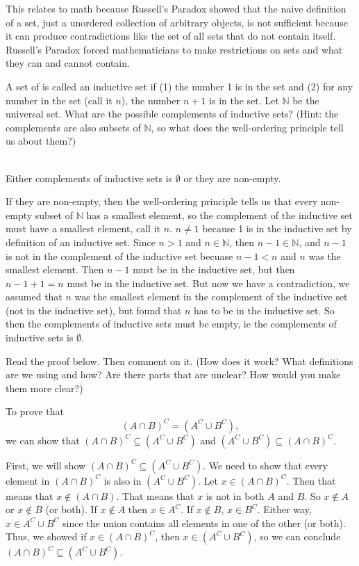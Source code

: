 \documentclass[12 pt]{exam}
\begin{document}
\begin{questions}
\begin{solution}
This relates to math because Russell's Paradox showed that the naive definition of a set, just a unordered collection of arbitrary objects, is not sufficient because it can produce contradictions like the set of all sets that do not contain itself. Russell's Paradox forced mathematicians to make restrictions on sets and what they can and cannot contain.
\end{solution}


\question  A set of  is called an inductive set if (1) the number 1 is in the set and (2) for any number in the set (call it $n$), the number $n+1$ is in the set. Let $\mathbb{N}$ be the universal set. What are the possible complements of inductive sets?  (Hint: the complements are also subsets of $\mathbb{N}$, so what does the well-ordering principle tell us about them?)
\begin{solution} \\
Either complements of inductive sets is $\emptyset$ or they are non-empty.

If they are non-empty, then the well-ordering principle tells us that every non-empty subset of $\mathbb{N}$ has a smallest element, so the complement of the inductive set must have a smallest element, call it $n$. $n \neq 1$ because 1 is in the inductive set by definition of an inductive set. Since $n > 1$ and $n \in \mathbb{N}$, then $n-1 \in \mathbb{N}$, and $n-1$ is not in the complement of the inductive set becuase $n-1 < n$ and $n$ was the smallest element. Then $n-1$ must be in the inductive set, but then $n-1 + 1 = n$ must be in the inductive set. But now we have a contradiction, we assumed that $n$ was the smallest element in the complement of the inductive set (not in the inductive set), but found that $n$ has to be in the inductive set. So then the complements of inductive sets must be empty, ie the complements of inductive sets is $\emptyset$.
\end{solution}

\question Read the proof below.  Then comment on it. (How does it work? What definitions are we using and how? Are there parts that are unclear? How would you make them more clear?)

To prove that $$(A \cap B)^C = (A^C \cup B^C),$$ we can show that $(A \cap B)^C \subseteq (A^C \cup B^C)$ and $(A^C \cup B^C) \subseteq (A \cap B)^C$. 

First, we will show $(A \cap B)^C \subseteq (A^C \cup B^C).$ We need to show that every element in $(A \cap B)^C$ is also in $(A^C \cup B^C)$. Let $x \in (A \cap B)^C$. Then that means that $x  \notin (A \cap B)$.  That means that $x$ is not in both $A$ and $B$.  So $x  \notin A$ or $x \notin B$ (or both). If $x  \notin A$ then $x \in A^C$. If $x  \notin B$, $x \in B^C$. Either way, $x \in A^C \cup B^C$ since the union contains all elements in one of the other (or both).  Thus, we showed if $x \in (A \cap B)^C$, then $x \in (A^C \cup B^C)$, so we can conclude $(A \cap B)^C \subseteq (A^C \cup B^C).$


\end{questions}
\end{document}
